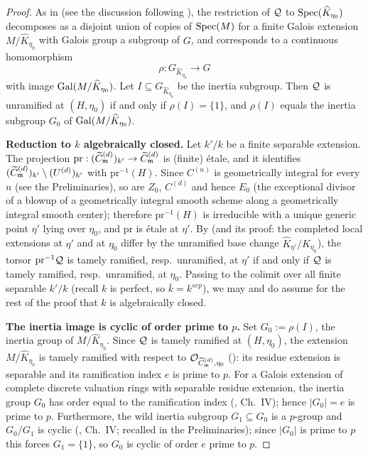 \begin{proof}
    As in  (see the discussion following
    ), the restriction of $\mathcal{Q}$ to
    $\operatorname{Spec}(\widehat{K}_{\eta_0})$ decomposes as a disjoint union of copies of $\operatorname{Spec}(M)$ for a
    finite Galois extension $M / \widehat{K}_{\eta_0}$ with Galois group a subgroup of $G$, and
    corresponds to a continuous homomorphism
    \[ \rho : G_{\widehat{K}_{\eta_0}} \to G \]
    with image $\operatorname{Gal}(M/\widehat{K}_{\eta_0})$. Let $I \subseteq G_{\widehat{K}_{\eta_0}}$ be the
    inertia subgroup. Then $\mathcal{Q}$ is unramified at $(H,\eta_0)$ if and only if
    $\rho(I) = \{1\}$, and $\rho(I)$ equals the inertia subgroup $G_0$ of
    $\operatorname{Gal}(M/\widehat{K}_{\eta_0})$.

    \textbf{Reduction to $k$ algebraically closed.}
    Let $k'/k$ be a finite separable extension. The projection
    $\mathrm{pr} : (\widetilde{C}_{\mathfrak{m}}^{(d)})_{k'} \to \widetilde{C}_{\mathfrak{m}}^{(d)}$ is (finite) \'etale, and it identifies
    $(\widetilde{C}_{\mathfrak{m}}^{(d)})_{k'} \setminus (U^{(d)})_{k'}$ with $\mathrm{pr}^{-1}(H)$. Since $C^{(n)}$ is
    geometrically integral for every $n$ (see the Preliminaries), so are $Z_0$, $C^{(d)}$ and hence
    $E_0$ (the exceptional divisor of a blowup of a geometrically integral smooth scheme along a
    geometrically integral smooth center); therefore $\mathrm{pr}^{-1}(H)$ is irreducible with a unique
    generic point $\eta'$ lying over $\eta_0$, and $\mathrm{pr}$ is \'etale at $\eta'$. By
     (and its proof: the completed local extensions at
    $\eta'$ and at $\eta_0$ differ by the unramified base change
    $\widehat{K}_{\eta'} / \widehat{K}_{\eta_0}$), the torsor $\mathrm{pr}^{-1}\mathcal{Q}$ is tamely ramified,
    resp.\ unramified, at $\eta'$ if and only if $\mathcal{Q}$ is tamely ramified, resp.\ unramified, at
    $\eta_0$. Passing to the colimit over all finite separable $k'/k$ (recall $k$ is perfect, so
    $\bar{k} = k^{sep}$), we may and do assume for the rest of the proof that $k$ is algebraically
    closed.

    \textbf{The inertia image is cyclic of order prime to $p$.}
    Set $G_0 := \rho(I)$, the inertia group of $M/\widehat{K}_{\eta_0}$. Since $\mathcal{Q}$ is tamely
    ramified at $(H, \eta_0)$, the extension $M/\widehat{K}_{\eta_0}$ is tamely ramified with
    respect to $\mathcal{O}_{\widetilde{C}_{\mathfrak{m}}^{(d)}, \eta_0}$ (): its residue
    extension is separable and its ramification index $e$ is prime to $p$. For a Galois
    extension of complete discrete valuation rings with separable residue extension, the
    inertia group $G_0$ has order equal to the ramification index (\cite{serreLF}, Ch.\ IV);
    hence $|G_0| = e$ is prime to $p$. Furthermore, the wild inertia subgroup
    $G_1 \subseteq G_0$ is a $p$-group and $G_0/G_1$ is cyclic (\cite{serreLF}, Ch.\ IV;
    recalled in the Preliminaries); since $|G_0|$ is prime to $p$ this forces $G_1 = \{1\}$,
    so $G_0$ is cyclic of order $e$ prime to $p$.


\end{proof}
